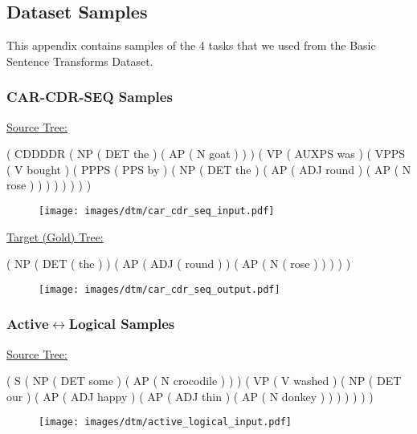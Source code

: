 \subsection{Dataset Samples} \label{sec:dataset-samples}
This appendix contains samples of the 4 tasks that we used from the Basic Sentence Transforms Dataset.

\subsubsection{\textbf{CAR-CDR-SEQ} Samples}

\underline{Source Tree:}

\hspace{.15in} ( CDDDDR ( NP ( DET the ) ( AP ( N goat ) ) ) ( VP ( AUXPS was ) ( VPPS ( V bought ) ( PPPS ( PPS by ) ( NP ( DET the ) ( AP ( ADJ round ) ( AP ( N rose ) ) ) ) ) ) ) )	

\begin{figure}[H]
\vskip 0.2in
\begin{center}
\centerline{\texttt{[image: images/dtm/car\_cdr\_seq\_input.pdf]}}
\end{center}
\vskip -0.2in
\end{figure}

\underline{Target (Gold) Tree:}

\hspace{.15in}( NP ( DET ( the ) ) ( AP ( ADJ ( round ) ) ( AP ( N ( rose ) ) ) ) )

\begin{figure}[H]
\vskip 0.2in
\begin{center}
\centerline{\texttt{[image: images/dtm/car\_cdr\_seq\_output.pdf]}}
\end{center}
\vskip -0.2in
\end{figure}

\subsubsection{\textbf{Active$\leftrightarrow$Logical} Samples}

\underline{Source Tree:}

\hspace{.15in} ( S ( NP ( DET some ) ( AP ( N crocodile ) ) ) ( VP ( V washed ) ( NP ( DET our ) ( AP ( ADJ happy ) ( AP ( ADJ thin ) ( AP ( N donkey ) ) ) ) ) ) )	

\begin{figure}[H]
\vskip 0.2in
\begin{center}
\centerline{\texttt{[image: images/dtm/active\_logical\_input.pdf]}}
\end{center}
\vskip -0.2in
\end{figure}

